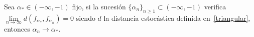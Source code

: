 \begin{proposition}
	\label{CondivParr}
	Sea $\alpha_{*} \in (-\infty,-1)$ fijo, si la sucesión $\{\alpha_{n}\}_{n \ge 1} \subset (-\infty,-1)$ verifica
	$\lim\limits_{n \to \infty} d(f_{\alpha_*}, f_{\alpha_{n}}) = 0$ siendo $d$ la distancia estocástica definida en~\eqref{triangular},
	entonces $\alpha_{n} \to \alpha_{*}$.
\end{proposition}
